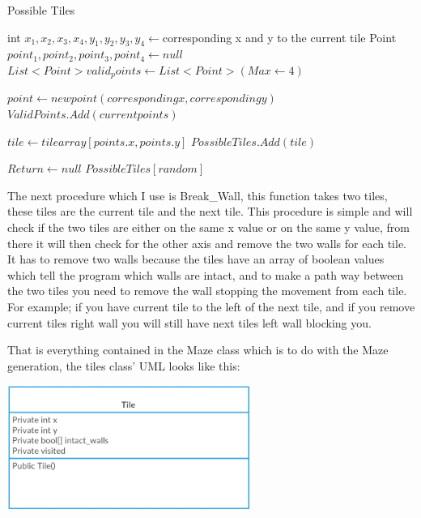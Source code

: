 \documentclass[12pt]{article}
\begin{document}
\begin{algorithm}[H]
\caption{Possible Tiles}
\begin{algorithmic}

\STATE int $x_1, x_2, x_3, x_4, y_1, y_2, y_3, y_4 \gets $corresponding x and y to the current tile
\STATE Point $point_1, point_2, point_3,  point_4 \gets null$
\STATE $List<Point> valid_points \gets List<Point>(Max \gets 4)$

	\STATE $point \gets new point(corresponding x, corresponding y)$
	\STATE $Valid Points.Add(current points)$
\ENDFOR

	\STATE $tile \gets tile array[points.x, points.y]$
		\STATE $Possible Tiles.Add(tile)$
	\ENDIF
\ENDFOR

	\STATE $Return \gets null$
\ELSE
	\STATE $Possible Tiles[random]$
\ENDIF

\end{algorithmic}
\end{algorithm}

The next procedure which I use is Break\_Wall, this function takes two tiles, these tiles are the current tile and the next tile. This procedure is simple and will check if the two tiles are either on the same x value or on the same y value, from there it will then check for the other axis and remove the two walls for each tile. It has to remove two walls because the tiles have an array of boolean values which tell the program which walls are intact, and to make a path way between the two tiles you need to remove the wall stopping the movement from each tile. For example; if you have current tile to the left of the next tile, and if you remove current tiles right wall you will still have next tiles left wall blocking you.

That is everything contained in the Maze class which is to do with the Maze generation, the tiles class' UML looks like this:

\includegraphics[width = 0.6\textwidth]{UML_Tile_Maze-Generation} %
\end{document}
